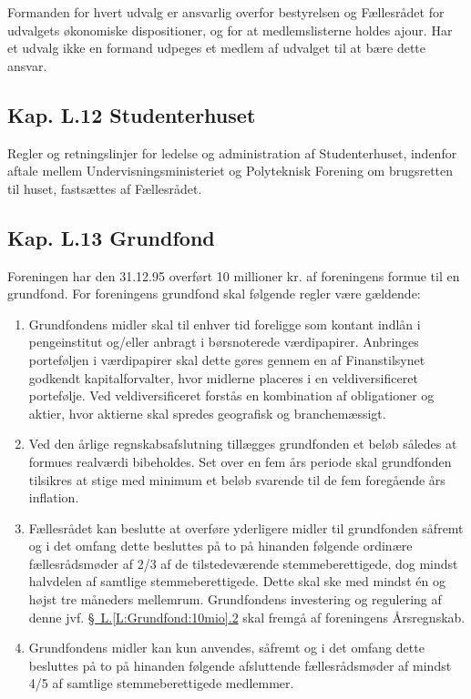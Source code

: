\begin{list}
\item Formanden for hvert udvalg er ansvarlig overfor bestyrelsen og Fællesrådet for udvalgets økonomiske dispositioner, og for at medlemslisterne holdes ajour. Har et udvalg ikke en formand udpeges et medlem af udvalget til at bære dette ansvar.
\subsection*{Kap. L.12 Studenterhuset}
\item Regler og retningslinjer for ledelse og administration af Studenterhuset, indenfor aftale mellem Undervisningsministeriet og Polyteknisk Forening om brugsretten til huset, fastsættes af Fællesrådet.
\subsection*{Kap. L.13 Grundfond}
\item \label{L:Grundfond:10mio} Foreningen har den 31.12.95 overført 10 millioner kr. af foreningens formue til en grundfond. For foreningens grundfond skal følgende regler være gældende:

\begin{enumerate}
\item Grundfondens midler skal til enhver tid foreligge som kontant indlån i pengeinstitut og/eller anbragt i børsnoterede værdipapirer. Anbringes porteføljen i værdipapirer skal dette gøres gennem en af Finanstilsynet godkendt kapitalforvalter, hvor midlerne placeres i en veldiversificeret portefølje. Ved veldiversificeret forstås en kombination af obligationer og aktier, hvor aktierne skal spredes geografisk og branchemæssigt.
\item Ved den årlige regnskabsafslutning tillægges grundfonden et beløb således at formues realværdi bibeholdes. Set over en fem års periode skal grundfonden tilsikres at stige med minimum et beløb svarende til de fem foregående års inflation.
\item Fællesrådet kan beslutte at overføre yderligere midler til grundfonden såfremt og i det omfang dette besluttes på to på hinanden følgende ordinære fællesrådsmøder af 2/3 af de tilstedeværende stemmeberettigede, dog mindst halvdelen af samtlige stemmeberettigede. Dette skal ske med mindst én og højst tre måneders mellemrum. Grundfondens investering og regulering af denne jvf. \hyperref[L:Grundfond:10mio]{\S \ L.\ref*{L:Grundfond:10mio}.2} skal fremgå af foreningens Årsregnskab.
\item Grundfondens midler kan kun anvendes, såfremt og i det omfang dette besluttes på to på hinanden følgende afsluttende fællesrådsmøder af mindst 4/5 af samtlige stemmeberettigede medlemmer.
\end{enumerate}


\end{list}
